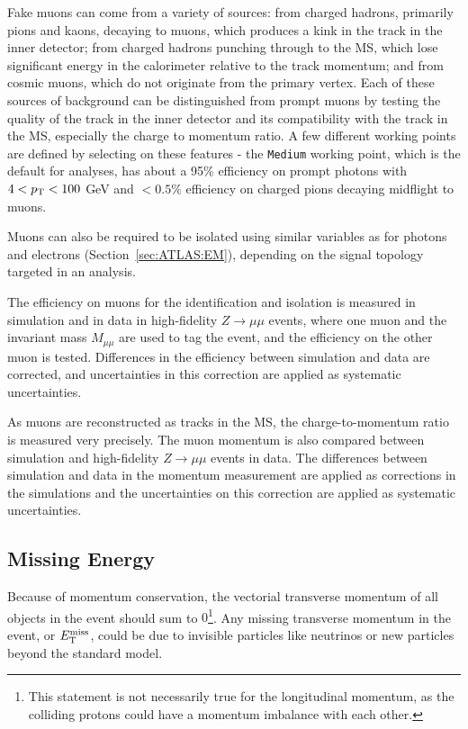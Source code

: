 Fake muons can come from a variety of sources: from charged hadrons, primarily pions and kaons, decaying to muons, which produces a kink in the track in the inner detector; from charged hadrons punching through to the MS, which lose significant energy in the calorimeter relative to the track momentum; and from cosmic muons, which do not originate from the primary vertex.
Each of these sources of background can be distinguished from prompt muons by testing the quality of the track in the inner detector and its compatibility with the track in the MS, especially the charge to momentum ratio.
A few different working points are defined by selecting on these features - the \texttt{Medium} working point, which is the default for analyses, has about a 95\% efficiency on prompt photons with $4<p_{\text{T}}<100$ GeV and $<0.5\%$ efficiency on charged pions decaying midflight to muons.

Muons can also be required to be isolated using similar variables as for photons and electrons (Section~\ref{sec:ATLAS:EM}), depending on the signal topology targeted in an analysis.

The efficiency on muons for the identification and isolation is measured in simulation and in data in high-fidelity $Z\rightarrow \mu\mu$ events, where one muon and the invariant mass $M_{\mu\mu}$ are used to tag the event, and the efficiency on the other muon is tested.
Differences in the efficiency between simulation and data are corrected, and uncertainties in this correction are applied as systematic uncertainties.

As muons are reconstructed as tracks in the MS, the charge-to-momentum ratio is measured very precisely.
The muon momentum is also compared between simulation and high-fidelity $Z\rightarrow \mu\mu$ events in data.
The differences between simulation and data in the momentum measurement are applied as corrections in the simulations and the uncertainties on this correction are applied as systematic uncertainties.

\subsection{Missing Energy}
\label{sec:ATLAS:met}
Because of momentum conservation, the vectorial transverse momentum of all objects in the event should sum to $0$\footnote{This statement is not necessarily true for the longitudinal momentum, as the colliding protons could have a momentum imbalance with each other.}.
Any missing transverse momentum in the event, or $E_{\text{T}}^\text{miss}$, could be due to invisible particles like neutrinos or new particles beyond the standard model.


